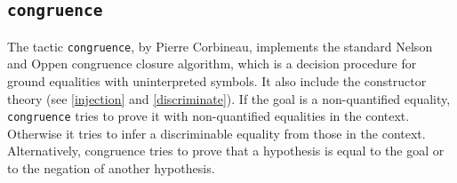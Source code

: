 \begin{coq_example*}






\subsection{\tt congruence
\label{congruence}}

The tactic {\tt congruence}, by Pierre Corbineau, implements the standard Nelson and Oppen
congruence closure algorithm, which is a decision procedure for ground
equalities with uninterpreted symbols. It also include the constructor theory
(see \ref{injection} and \ref{discriminate}).
If the goal is a non-quantified equality, {\tt congruence} tries to
prove it with non-quantified equalities in the context. Otherwise it
tries to infer a discriminable equality from those in the context. Alternatively, congruence tries to prove that a hypothesis is equal to the goal or to the negation of another hypothesis.


\end{coq_example*}
